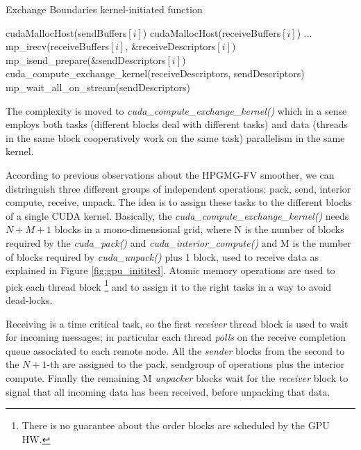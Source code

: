\documentclass[conference]{IEEEtran}
\begin{document}

\begin{algorithm}
\small
\caption{Exchange Boundaries kernel-initiated function}
\label{algo:exchange_boundaries_gpu}
\begin{algorithmic}[1]
\State cudaMallocHost(sendBuffers$[i]$)
\State cudaMallocHost(receiveBuffers$[i]$)
\EndFor
\State ...
		\State mp\_irecv(receiveBuffers$[i]$, \&receiveDescriptors$[i]$)    
	\EndFor
		\State mp\_isend\_prepare(\&sendDescriptors$[i]$)
	\EndFor
	\State cuda\_compute\_exchange\_kernel(receiveDescriptors, sendDescriptors)
	\State mp\_wait\_all\_on\_stream(sendDescriptors)
\EndFunction
\end{algorithmic}
\end{algorithm}

The complexity is moved to \textit{cuda\_compute\_exchange\_kernel()} which
in a sense employs both tasks (different blocks deal with different tasks)
and data (threads in the same block cooperatively work on the same task)
parallelism in the same kernel.

According to previous observations about the HPGMG-FV smoother, we can
distringuish three different groups of independent operations:
\lbrack pack, send\rbrack,
\lbrack interior compute\rbrack,
\lbrack receive, unpack\rbrack. 
% 
The idea is to assign these tasks to the different blocks of a single CUDA
kernel.
%
Basically, the \textit{cuda\_compute\_exchange\_kernel()} needs $N+M+1$
blocks in a mono-dimensional grid, where N is the number of blocks required
by the \textit{cuda\_pack()} and \textit{cuda\_interior\_compute()} and M
is the number of blocks required by \textit{cuda\_unpack()} plus 1 block,
used to receive data as explained in Figure \ref{fig:gpu_initited}.
% 
Atomic memory operations are used to pick each thread block
\footnote{There is no guarantee about the order blocks are scheduled by the
  GPU HW.} and to assign it to the right tasks in a way to avoid
dead-locks.

Receiving is a time critical task, so the first \textit{receiver} thread
block is used to wait for incoming messages; in particular each thread
\textit{polls} on the receive completion queue associated to each remote
node.
% 
All the \textit{sender} blocks from the second to the $N+1$-th are assigned
to the \lbrack pack, send\rbrack group of operations plus the \lbrack
interior compute\rbrack.
% 
Finally the remaining M \textit{unpacker} blocks wait for the
\textit{receiver} block to signal that all incoming data has been received,
before unpacking that data.
\end{document}
